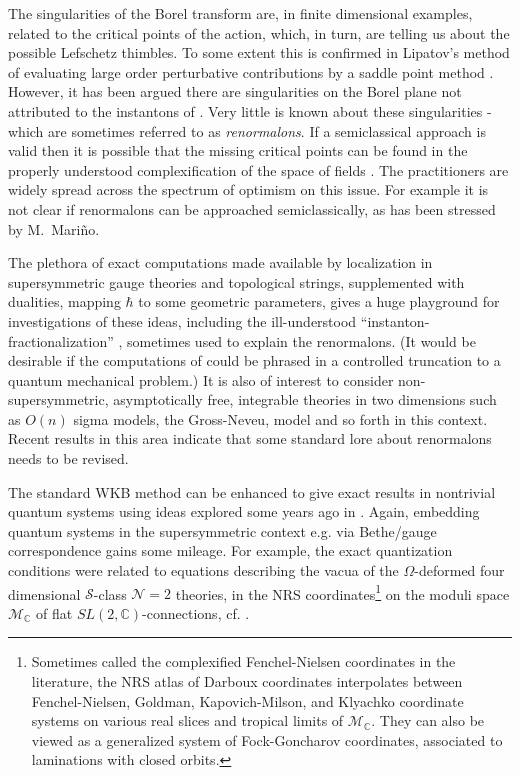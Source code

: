 \documentclass[12pt]{article}
\newcommand\BC{\mathbb{C}}
\newcommand\CalN{\mathcal{N}}
\newcommand\CalS{\mathcal{S}}
\newcommand\CalM{\mathcal{M}}
\begin{document}
 
 The singularities of the Borel transform are, in finite dimensional examples, related to the critical points of the action, which, in turn, are telling us about the possible Lefschetz thimbles. To some extent this is confirmed in Lipatov's method
of evaluating large order perturbative contributions by a saddle point method \cite{Lipatov:1976ny}. However, it has been argued \cite{Hooft1977CanWM} there are singularities on the Borel plane not attributed to the instantons of \cite{Lipatov:1976ny}. Very little is known about these singularities - which are sometimes referred to as \emph{renormalons}. If a semiclassical approach is valid then it is possible that the missing critical points can be found in the properly understood complexification of the space of fields \cite{Nekrasov:2018pqq, NikitaKrichever1}. The practitioners are widely spread across the spectrum of optimism on this issue. For example it is not clear if renormalons can be approached semiclassically, as has been stressed by M.~Mari{\~n}o.


The plethora of exact computations made available by localization in supersymmetric gauge theories and topological strings, supplemented with dualities, mapping
$\hbar$ to some geometric parameters, gives
a huge playground for investigations of these ideas, including the ill-understood ``instanton-fractionalization'' \cite{Dunne:2012ae, Jeong:2017pai}, sometimes used to explain the renormalons.
(It would be desirable if the computations of 
\cite{Dunne:2012ae} could be phrased in a controlled 
truncation to a quantum mechanical problem.) 
It is also of interest to consider non-supersymmetric, 
asymptotically free, integrable theories in two dimensions such as $O(n)$ sigma models, the Gross-Neveu, model and so forth in this context. Recent results in this area 
\cite{Marino:2021dzn} indicate that some standard lore about renormalons  needs to be revised. 

The standard WKB method can be enhanced to give
exact results in nontrivial quantum systems using ideas explored
some years ago in \cite{Delabaere,Voros}. Again, embedding quantum systems in the supersymmetric context e.g. via Bethe/gauge correspondence gains some mileage. For example, the exact quantization conditions \cite{Jentschura:2004jg} were related \cite{Krefl:2014,Basar:2015xna}  
to equations \cite{Nekrasov:2009rc}  describing the vacua of the  $\Omega$-deformed four dimensional $\CalS$-class ${\CalN}=2$ theories, in the NRS coordinates\footnote{Sometimes called the complexified Fenchel-Nielsen coordinates in the literature, the NRS atlas \cite{NRS} of Darboux coordinates
interpolates between Fenchel-Nielsen, Goldman,  Kapovich-Milson, and Klyachko coordinate systems on various real slices and tropical limits of ${\CalM}_{\BC}$. They can also be viewed as a generalized system of Fock-Goncharov coordinates, associated to laminations with closed orbits.} 
on the moduli space ${\CalM}_{\BC}$ of flat $SL(2,{\BC})$-connections, cf. \cite{Teschner:2017djr}.
\end{document}
